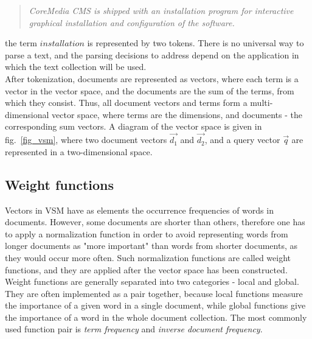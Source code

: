 \begin{quote}
\textit{CoreMedia CMS is shipped with an installation program for interactive graphical installation and configuration of the software.}
\end{quote}

the term $ installation $ is represented by two tokens. There is no universal way to parse a text, and the parsing decisions to address depend on the application in which the text collection will be used. \\

After tokenization, documents are represented as vectors, where each term is a vector in the vector space, and the documents are the sum of the terms, from which they consist. Thus, all document vectors and terms form a multi-dimensional vector space, where terms are the dimensions, and documents - the corresponding sum vectors. A diagram of the vector space is given in fig.~\ref{fig_vsm}, where two document vectors $\vec{d_{1}}$ and $\vec{d_{2}}$, and a query vector $\vec{q}$ are represented in a two-dimensional space. \\

\subsection{Weight functions}
\label{lsa:weight_functions}
Vectors in \gls{VSM} have as elements the occurrence frequencies of words in documents. However, some documents are shorter than others, therefore one has to apply a normalization function in order to avoid representing words from longer documents as "more important" than words from shorter documents, as they would occur more often. Such normalization functions are called weight functions, and they are applied after the vector space has been constructed. \\

Weight functions are generally separated into two categories - local and global. They are often implemented as a pair together, because local functions measure the importance of a given word in a single document, while global functions give the importance of a word in the whole document collection. The most commonly used function pair is \textit{term frequency} and \textit{inverse document frequency}. \\

